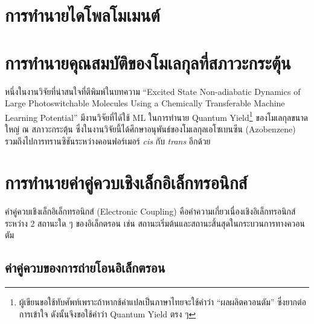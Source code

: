 \section{การทำนายไดโพลโมเมนต์}
\label{sec:pred_dipole_moment}

\autocite{knijff2021,liu2020,pereira2018,staacke2022,sun2022,veit2020,vo2019}

\section{การทำนายคุณสมบัติของโมเลกุลที่สภาวะกระตุ้น}
\label{sec:pred_ex_prop}

หนึ่งในงานวิจัยที่น่าสนใจที่ตีพิมพ์ในบทความ \enquote{Excited State Non-adiabatic Dynamics of Large Photoswitchable Molecules 
Using a Chemically Transferable Machine Learning Potential}\autocite{axelrod2022} มีงานวิจัยที่ได้ใช้ ML ในการทำนาย 
Quantum Yield\footnote{ผู้เขียนขอใช้ทับศัพท์เพราะถ้าหากช้คำแปลเป็นภาษาไทยจะใช้คำว่า \enquote{ผลผลิตควอนตัม} ซึ่งยากต่อการเข้าใจ 
ดังนั้นจึงขอใช้คำว่า Quantum Yield ตรง ๆ} ของโมเลกุลขนาดใหญ่ ณ สภาวะกระตุ้น ซึ่งในงานวิจัยนี้ได้ศึกษาอนุพันธ์ของโมเลกุลเอโซเบนซีน 
(Azobenzene) รวมถึงไปการทรานซิชันระหว่างคอนฟอร์เมอร์ \textit{cis} กับ \textit{trans} อีกด้วย

\section{การทำนายค่าคู่ควบเชิงเล็กอิเล็กทรอนิกส์}
\label{sec:pred_elec_coupling}

ค่าคู่ควบเชิงเล็กอิเล็กทรอนิกส์ (Electronic Coupling) คือค่าความเกี่ยวเนื่องเชิงอิเล็กทรอนิกส์ระหว่าง 2 สถานะใด ๆ ของอิเล็กตรอน เช่น 
สถานะเริ่มต้นและสถานะสิ้นสุดในกระบวนการทางควอนตัม 

\subsection{ค่าคู่ควบของการถ่ายโอนอิเล็กตรอน}
\label{ssec:pred_etran_coupling}



